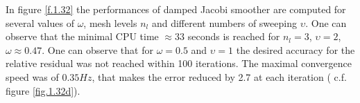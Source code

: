       In figure \ref{f.1.32} the performances of damped Jacobi smoother are computed for several values of $\omega$, mesh levels $n_l$ and different numbers of sweeping $\upsilon$. One can observe that the minimal CPU time $\approx33$ seconds is reached for $n_l=3$, $\upsilon=2$, $\omega\approx0.47$. 
      One can observe that for $\omega=0.5$ and $\upsilon=1$ the desired accuracy for the relative residual was not reached within 100 iterations. 
      The maximal convergence speed was of $0.35 Hz$, that makes the error reduced by 2.7 at each iteration ( c.f. figure \ref{fig.1.32d}).
       \begin{figure}[hbt!]
         \centering
              \\
\end{figure}
